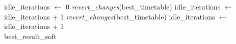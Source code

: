 \begin{algorithm}
\begin{algorithmic}[1]
                    \State {}
                \EndIf
                \State idle\_iterations $\gets$ 0
            \Else
                \State \textit{revert\_changes}(best\_timetable)
                \State idle\_iterations $\gets$ idle\_iterations + 1
            \EndIf
        \Else
            \State \textit{revert\_changes}(best\_timetable)
            \State idle\_iterations $\gets$ idle\_iterations + 1
        \EndIf
    \EndWhile
    \\
    \State \Return best\_result\_soft
\EndFunction
\end{algorithmic}
\end{algorithm}
